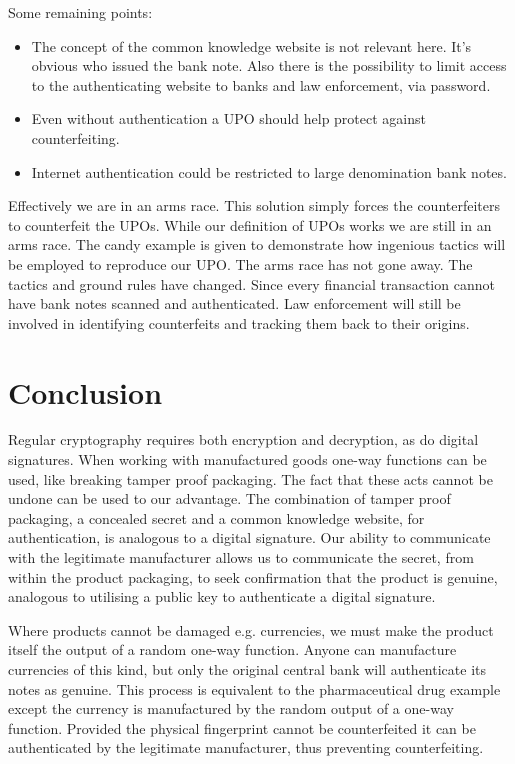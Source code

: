 \documentclass[smallextended]{svjour3}       	\smartqed  \usepackage{graphicx}
\begin{document}
Some remaining points:
\begin{itemize}
  \item The concept of the common knowledge website is not relevant here. It's obvious who issued the bank note. Also there is the possibility to limit access to the authenticating website to banks and law enforcement, via password.
  \item Even without authentication a UPO should help protect against counterfeiting.
  \item Internet authentication could be restricted to large denomination bank notes.
\end{itemize}

\par Effectively we are in an arms race. This solution simply forces the counterfeiters to counterfeit the UPOs. While our definition of UPOs works we are still in an arms race. The candy example is given to demonstrate how ingenious tactics will be employed to reproduce our UPO. The arms race has not gone away. The tactics and ground rules have changed. Since every financial transaction cannot have bank notes scanned and authenticated. Law enforcement will still be involved in identifying counterfeits and tracking them back to their origins.

\section{Conclusion}
Regular cryptography requires both encryption and decryption, as do digital signatures. When working with manufactured goods one-way functions can be used, like breaking tamper proof packaging. The fact that these acts cannot be undone can be used to our advantage. The combination of tamper proof packaging, a concealed secret and a common knowledge website, for authentication, is analogous to a digital signature. Our ability to communicate with the legitimate manufacturer allows us to communicate the secret, from within the product packaging, to seek confirmation that the product is genuine, analogous to utilising a public key to authenticate a digital signature.

Where products cannot be damaged e.g. currencies, we must make the product itself the output of a random one-way function. Anyone can manufacture currencies of this kind, but only the original central bank will authenticate its notes as genuine. This process is equivalent to the pharmaceutical drug example except the currency is manufactured by the random output of a one-way function. Provided the physical fingerprint cannot be counterfeited it can be authenticated by the legitimate manufacturer, thus preventing counterfeiting.
\end{document}
